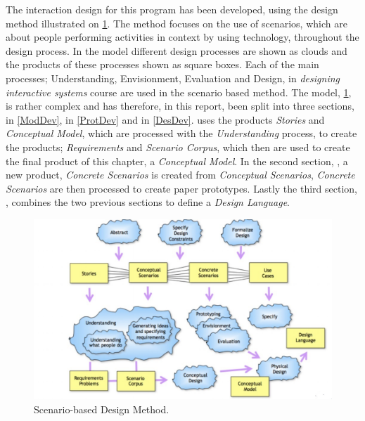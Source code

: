 The interaction design for this program has been developed, using the design method illustrated on \cref{scenarioModel}. The method focuses on the use of scenarios, which are about people performing activities in context by using technology, throughout the design process. In the model different design processes are shown as clouds and the products of these processes shown as square boxes. Each of the main processes; Understanding, Envisionment, Evaluation and Design, in \textit{designing interactive systems} course are used in the scenario based method. The model, \cref{scenarioModel}, is rather complex and has therefore, in this report, been split into three sections,  in \cref{ModDev},  in \cref{ProtDev} and  in \cref{DesDev}.  uses the products \textit{Stories} and \textit{Conceptual Model}, which are processed with the \textit{Understanding} process, to create the products; \textit{Requirements} and \textit{Scenario Corpus}, which then are used to create the final product of this chapter, a \textit{Conceptual Model}. In the second section, , a new product, \textit{Concrete Scenarios} is created from \textit{Conceptual Scenarios}, \textit{Concrete Scenarios} are then processed to create paper prototypes. Lastly the third section, , combines the two previous sections to define a \textit{Design Language}.

\begin{figure}[H]
	\centering
	\includegraphics[width=1\textwidth]{Grafik/scenarioModel}
	\caption{Scenario-based Design Method.}
	\label{scenarioModel}
\end{figure}